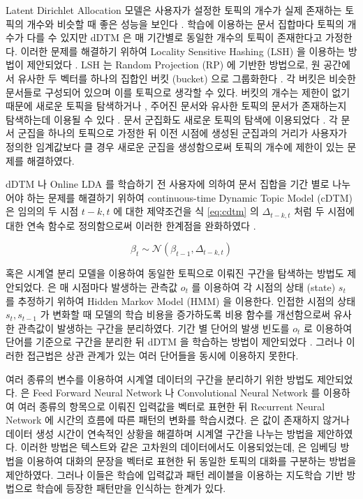 \documentclass[oneside, ko,phd]{snuthesis_utf8_kor}
\begin{document}
Latent Dirichlet Allocation 모델은 사용자가 설정한 토픽의 개수가 실제 존재하는 토픽의 개수와 비슷할 때 좋은 성능을 보인다 \cite{alsumait2009topic, lau2012line}.
학습에 이용하는 문서 집합마다 토픽의 개수가 다를 수 있지만 dDTM 은 매 기간별로 동일한 개수의 토픽이 존재한다고 가정한다.
이러한 문제를 해결하기 위하여 Locality Sensitive Hashing (LSH) 을 이용하는 방법이 제안되었다 \cite{wurzer2015tracking}.
LSH 는 Random Projection (RP) \cite{bingham2001random} 에 기반한 방법으로, 원 공간에서 유사한 두 벡터를 하나의 집합인 버킷 (bucket) 으로 그룹화한다 \cite{indyk1998approximate, charikar2002similarity}.
각 버킷은 비슷한 문서들로 구성되어 있으며 이를 토픽으로 생각할 수 있다.
버킷의 개수는 제한이 없기 때문에 새로운 토픽을 탐색하거나 \cite{ding2013topic}, 주어진 문서와 유사한 토픽의 문서가 존재하는지 탐색하는데 이용될 수 있다 \cite{zhang2010self, sundaram2013streaming}.
문서 군집화도 새로운 토픽의 탐색에 이용되었다 \cite{yang2012framework, wurzer2015tracking}.
각 문서 군집을 하나의 토픽으로 가정한 뒤 이전 시점에 생성된 군집과의 거리가 사용자가 정의한 임계값보다 클 경우 새로운 군집을 생성함으로써 토픽의 개수에 제한이 있는 문제를 해결하였다.

dDTM 나 Online LDA 를 학습하기 전 사용자에 의하여 문서 집합을 기간 별로 나누어야 하는 문제를 해결하기 위하여  continuous-time Dynamic Topic Model (cDTM) 은 임의의 두 시점 $t-k, t$ 에 대한 제약조건을 식 \ref{eq:cdtm} 의 $\Delta_{t-k, t}$ 처럼 두 시점에 대한 연속 함수로 정의함으로써 이러한 한계점을 완화하였다 \cite{wang2012continuous}. 

\begin{equation}
\label{eq:cdtm}
\beta_t \sim \mathcal{N}(\beta_{t-1}, \Delta_{t-k, t})
\end{equation}

혹은 시계열 분리 모델을 이용하여 동일한 토픽으로 이뤄진 구간을 탐색하는 방법도 제안되었다.
\cite{kleinberg2003bursty} 은 매 시점마다 발생하는 관측값 $o_t$ 를 이용하여 각 시점의 상태 (state) $s_t$ 를 추정하기 위하여 Hidden Markov Model (HMM) 을 이용한다.
인접한 시점의 상태 $s_t, s_{t-1}$ 가 변화할 때 모델의 학습 비용을 증가하도록 비용 함수를 개선함으로써 유사한 관측값이 발생하는 구간을 분리하였다.
기간 별 단어의 발생 빈도를 $o_t$ 로 이용하여 단어를 기준으로 구간을 분리한 뒤 dDTM 을 학습하는 방법이 제안되었다 \cite{takahashi2012applying, huang2017probabilistic}.
그러나 이러한 접근법은 상관 관계가 있는 여러 단어들을 동시에 이용하지 못한다.

여러 종류의 변수를 이용하여 시계열 데이터의 구간을 분리하기 위한 방법도 제안되었다.
\cite{karim2018multivariate, yao2017deepsense} 은 Feed Forward Neural Network 나 Convolutional Neural Network 를 이용하여 여러 종류의 항목으로 이뤄진 입력값을 벡터로 표현한 뒤 Recurrent Neural Network 에 시간의 흐름에 따른 패턴의 변화를 학습시켰다.
\cite{che2018recurrent} 은 값이 존재하지 않거나 데이터 생성 시간이 연속적인 상황을 해결하며 시계열 구간을 나누는 방법을 제안하였다.
이러한 방법은 텍스트와 같은 고차원의 데이터에서도 이용되었는데, \cite{kim2016exploring} 은 임베딩 방법을 이용하여 대화의 문장을 벡터로 표현한 뒤 동일한 토픽의 대화를 구분하는 방법을 제안하였다.
그러나 이들은 학습에 입력값과 패턴 레이블을 이용하는 지도학습 기반 방법으로 학습에 등장한 패턴만을 인식하는 한계가 있다.
\end{document}
